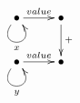 $\xymatrix{
   \bullet \ar@(dl,dr)[]_{x} \ar[r]^{value} & \bullet \ar[d]^{+} \\
   \bullet \ar@(dl,dr)[]_{y} \ar[r]^{value} & \bullet
}$

